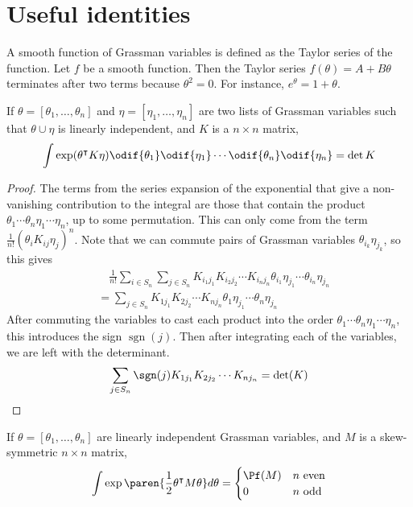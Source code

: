 \section{Useful identities}
A smooth function of Grassman variables is defined as the Taylor
series of the function. 
Let $f$ be a smooth function. Then the Taylor series  $f(\theta)=A+B\theta$  
terminates after two terms because  $\theta^2=0$. 
For instance, $e^{\theta} = 1 + \theta$. 

\begin{lem}
	If $\theta = [\theta_1,\ldots,\theta_n]$ and $\eta=[\eta_1,\ldots,\eta_n]$
	are two lists of Grassman variables such that $\theta\cup\eta$ is linearly
	independent, and $K$ is a  $n\times n$ matrix,
	\[
	\int \exp (\theta^\intercal K \eta) 
	\odif{\theta_1}\odif{\eta_1}\cdots\odif{\theta_n}\odif{\eta_n} = \det K
	\] 
\end{lem}
\begin{proof}
	The terms from the series expansion of the exponential that give a
	non-vanishing contribution to the integral are those that contain the product
	$\theta_1\cdots\theta_n\eta_1\cdots\eta_n$, up to some permutation.
	This can only come from the term $\frac{1}{n!}(\theta_i K_{ij} \eta_j)^n$. Note that we
	can commute pairs of Grassman variables $\theta_{i_k} \eta_{j_k}$, so this gives
	\begin{align*}
	&\quad \frac{1}{n!}\sum_{i\in S_n} \sum_{j\in S_n} 
	K_{i_1j_1}K_{i_2j_2} \cdots K_{i_nj_n} 
	\theta_{i_1}\eta_{j_1}\cdots \theta_{i_n}\eta_{j_n} \\
	&= \sum_{j\in S_n} K_{1j_1}K_{2j_2} \cdots K_{nj_n} \theta_1\eta_{j_1}\cdots
	\theta_n\eta_{j_n} 
	\end{align*}
	After commuting the variables to cast each product into the order 
	$\theta_1\cdots\theta_n\eta_1\cdots\eta_{n}$, this introduces the sign
	$\operatorname{sgn}(j)$. Then after integrating each of the variables, we
	are left with the determinant. 
	\[
		\sum_{j\in S_n} \sgn(j) K_{1j_1}K_{2j_2} \cdots K_{nj_n} = \det(K)
	\] 
\end{proof}
\begin{lem}
	If $\theta = [\theta_1,\ldots,\theta_n]$ are linearly independent Grassman
	variables, and $M$ is a skew-symmetric  $n\times n$ matrix,
	\[
	\int \exp\paren{\frac{1}{2}\theta^{\intercal}M\theta} d\theta =
	\begin{cases}
		\Pf(M) & n \textrm{ even} \\
		0 & n \textrm{ odd}
	\end{cases}
	\] 
\end{lem}
